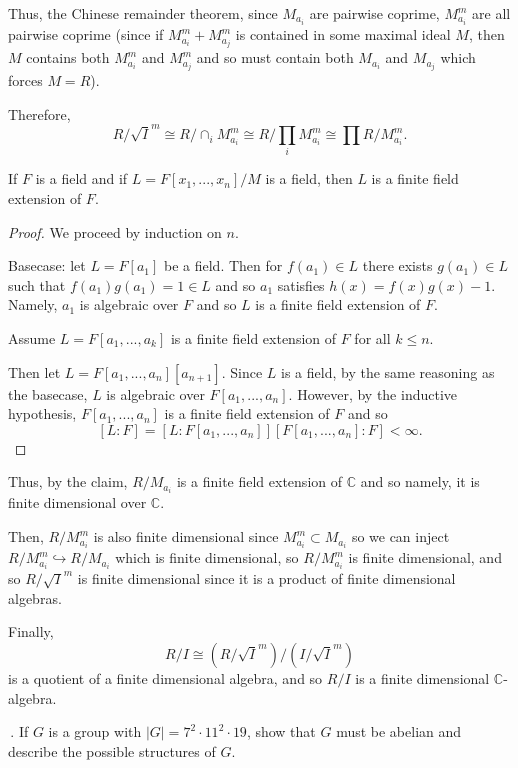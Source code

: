 \documentclass[12pt]{AlgebraQual}
\begin{document}
\begin{solution}
Thus, the Chinese remainder theorem, since $M_{a_i}$ are pairwise coprime, $M_{a_i}^m$ are all pairwise coprime (since if $M_{a_i}^m+M_{a_j}^m$ is contained in some maximal ideal $M$, then $M$ contains both $M_{a_i}^m$ and $M_{a_j}^m$ and so must contain both $M_{a_i}$ and $M_{a_j}$ which forces $M=R$).

Therefore, $$R/\sqrt{I}^m\cong R/\cap_iM_{a_i}^m\cong R/\prod_iM_{a_i}^m\cong \prod R/M_{a_i}^m.$$

\begin{claim} If $F$ is a field and if $L=F[x_1,...,x_n]/M$ is a field, then $L$ is a finite field extension of $F$.
\begin{proof} We proceed by induction on $n.$

Basecase: let $L=F[a_1]$ be a field. Then for $f(a_1)\in L$ there exists $g(a_1)\in L$ such that $f(a_1)g(a_1)=1\in L$ and so $a_1$ satisfies $h(x)=f(x)g(x)-1$. Namely, $a_1$ is algebraic over $F$ and so $L$ is a finite field extension of $F.$

Assume $L=F[a_1,...,a_k]$ is a finite field extension of $F$ for all $k\le n$.

Then let $L=F[a_1,...,a_n][a_{n+1}]$. Since $L$ is a field, by the same reasoning as the basecase, $L$ is algebraic over $F[a_1,...,a_n]$. However, by the inductive hypothesis, $F[a_1,...,a_n]$ is a finite field extension of $F$ and so $$[L:F]=[L:F[a_1,...,a_n]][F[a_1,...,a_n]:F]<\infty.$$
\end{proof}
\end{claim}

Thus, by the claim, $R/M_{a_i}$ is a finite field extension of $\mathbb{C}$ and so namely, it is finite dimensional over $\mathbb{C}$.

Then, $R/M_{a_i}^m$ is also finite dimensional since $M_{a_i}^m\subset M_{a_i}$ so we can inject $R/M_{a_i}^m\hookrightarrow R/M_{a_i}$ which is finite dimensional, so $R/M_{a_i}^m$ is finite dimensional, and so $R/\sqrt{I}^m$ is finite dimensional since it is a product of finite dimensional algebras.

Finally, $$R/I\cong (R/\sqrt{I}^m)/(I/\sqrt{I}^m)$$ is a quotient of a finite dimensional algebra, and so $R/I$ is a finite dimensional $\mathbb{C}$-algebra.
\end{solution}
\newpage


\begin{problem} $\,$.
If $G$ is a group with $|G|=7^2\cdot 11^2\cdot 19$, show that $G$ must be abelian and describe the possible structures of $G.$
\end{problem}
\end{document}
